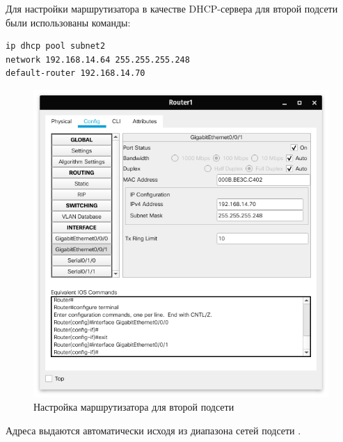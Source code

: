 \lstset{
    language=bash
}

Для настройки маршрутизатора в качестве DHCP-сервера для второй подсети были использованы команды:
\begin{lstlisting}[caption={Команды для настройки второй подсети}]
ip dhcp pool subnet2
network 192.168.14.64 255.255.255.248
default-router 192.168.14.70
\end{lstlisting}

\begin{figure}[H]
    \centering
    \includegraphics[width=0.8\linewidth]{images/src02.png}
    \caption{Настройка маршрутизатора для второй подсети}%
    \label{fig:servers2}
\end{figure}

Адреса выдаются автоматически исходя из диапазона сетей подсети .

